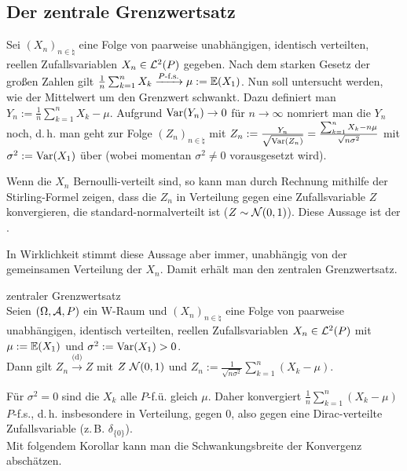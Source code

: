 \pagebreak

\subsection{%
    Der zentrale Grenzwertsatz%
}

\begin{Bem}
    Sei $(X_n)_{n \in \natural}$ eine Folge von paarweise unabhängigen,
    identisch verteilten, reellen Zufallsvariablen $X_n \in \mathcal{L}^2(P)$ gegeben.
    Nach dem starken Gesetz der großen Zahlen gilt
    $\frac{1}{n} \sum_{k=1}^n X_k \xrightarrow{P\text{-f.s.}} \mu := \mathbb{E}(X_1)$.
    Nun soll untersucht werden, wie der Mittelwert um den Grenzwert schwankt.
    Dazu definiert man $Y_n := \frac{1}{n} \sum_{k=1}^n X_k - \mu$.
    Aufgrund $\text{Var}(Y_n) \to 0$ für $n \to \infty$ nomriert man die $Y_n$ noch,
    d.\,h. man geht zur Folge $(Z_n)_{n \in \natural}$ mit
    $Z_n := \frac{Y_n}{\sqrt{\text{Var}(Z_n)}} = \frac{\sum_{k=1}^n X_k - n \mu}
    {\sqrt{n \sigma^2}}$ mit $\sigma^2 := \text{Var}(X_1)$ über
    (wobei momentan $\sigma^2 \not= 0$ vorausgesetzt wird).

    Wenn die $X_n$ Bernoulli-verteilt sind, so kann man durch Rechnung mithilfe der Stirling-Formel
    zeigen, dass die $Z_n$ in Verteilung gegen eine Zufallsvariable $Z$ konvergieren,
    die standard-normalverteilt ist ($Z \sim \mathcal{N}(0, 1)$).
    Diese Aussage ist der .

    In Wirklichkeit stimmt diese Aussage aber immer, unabhängig von der gemeinsamen Verteilung
    der $X_n$.
    Damit erhält man den zentralen Grenzwertsatz.
\end{Bem}

\linie

\begin{Satz}{zentraler Grenzwertsatz}\\
    Seien $(\Omega, \mathcal{A}, P)$ ein W-Raum und $(X_n)_{n \in \natural}$
    eine Folge von paarweise unabhängigen, identisch verteilten,
    reellen Zufallsvariablen $X_n \in \mathcal{L}^2(P)$ mit $\mu := \mathbb{E}(X_1)$ und
    $\sigma^2 := \text{Var}(X_1) > 0$.\\
    Dann gilt $Z_n \xrightarrow{\text{(d)}} Z$ mit $Z ~ \mathcal{N}(0, 1)$ und
    $Z_n := \frac{1}{\sqrt{n \sigma^2}} \sum_{k=1}^n (X_k - \mu)$.
\end{Satz}

\begin{Bem}
    Für $\sigma^2 = 0$ sind die $X_k$ alle $P$-f.ü. gleich $\mu$.
    Daher konvergiert $\frac{1}{n} \sum_{k=1}^n (X_k - \mu)$ $P$-f.s., d.\,h.
    insbesondere in Verteilung, gegen $0$,
    also gegen eine Dirac-verteilte Zufallsvariable (z.\,B. $\delta_{\{0\}}$).\\
    Mit folgendem Korollar kann man die Schwankungsbreite der Konvergenz abschätzen.
\end{Bem}

